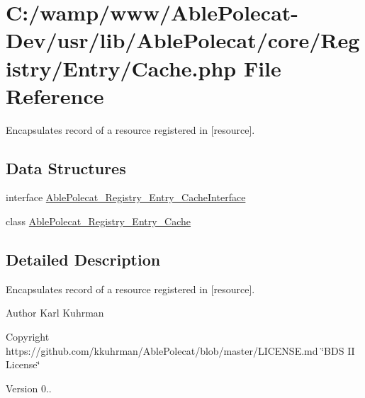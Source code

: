 \hypertarget{_cache_8php}{}\section{C\+:/wamp/www/\+Able\+Polecat-\/\+Dev/usr/lib/\+Able\+Polecat/core/\+Registry/\+Entry/\+Cache.php File Reference}
\label{_cache_8php}


Encapsulates record of a resource registered in \mbox{[}resource\mbox{]}.  


\subsection*{Data Structures}
\begin{DoxyCompactItemize}
\item 
interface \hyperlink{interface_able_polecat___registry___entry___cache_interface}{Able\+Polecat\+\_\+\+Registry\+\_\+\+Entry\+\_\+\+Cache\+Interface}
\item 
class \hyperlink{class_able_polecat___registry___entry___cache}{Able\+Polecat\+\_\+\+Registry\+\_\+\+Entry\+\_\+\+Cache}
\end{DoxyCompactItemize}


\subsection{Detailed Description}
Encapsulates record of a resource registered in \mbox{[}resource\mbox{]}. 

\begin{DoxyAuthor}{Author}
Karl Kuhrman 
\end{DoxyAuthor}
\begin{DoxyCopyright}{Copyright}
https\+://github.com/kkuhrman/\+Able\+Polecat/blob/master/\+L\+I\+C\+E\+N\+S\+E.\+md \char`\"{}\+B\+D\+S I\+I License\char`\"{} 
\end{DoxyCopyright}
\begin{DoxyVersion}{Version}
0.. 
\end{DoxyVersion}
